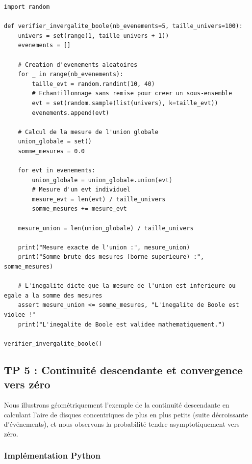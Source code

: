 \documentclass[11pt,a4paper]{article}
\begin{document}
\begin{lstlisting}
import random

def verifier_invergalite_boole(nb_evenements=5, taille_univers=100):
    univers = set(range(1, taille_univers + 1))
    evenements = []

    # Creation d'evenements aleatoires
    for _ in range(nb_evenements):
        taille_evt = random.randint(10, 40)
        # Echantillonnage sans remise pour creer un sous-ensemble
        evt = set(random.sample(list(univers), k=taille_evt))
        evenements.append(evt)

    # Calcul de la mesure de l'union globale
    union_globale = set()
    somme_mesures = 0.0

    for evt in evenements:
        union_globale = union_globale.union(evt)
        # Mesure d'un evt individuel
        mesure_evt = len(evt) / taille_univers
        somme_mesures += mesure_evt

    mesure_union = len(union_globale) / taille_univers

    print("Mesure exacte de l'union :", mesure_union)
    print("Somme brute des mesures (borne superieure) :", somme_mesures)

    # L'inegalite dicte que la mesure de l'union est inferieure ou egale a la somme des mesures
    assert mesure_union <= somme_mesures, "L'inegalite de Boole est violee !"
    print("L'inegalite de Boole est validee mathematiquement.")

verifier_invergalite_boole()
\end{lstlisting}



\subsection*{TP 5 : Continuité descendante et convergence vers zéro}

Nous illustrons géométriquement l'exemple de la continuité descendante en calculant l'aire de disques concentriques de plus en plus petits (suite décroissante d'événements), et nous observons la probabilité tendre asymptotiquement vers zéro.

\subsubsection*{Implémentation Python}
\end{document}
